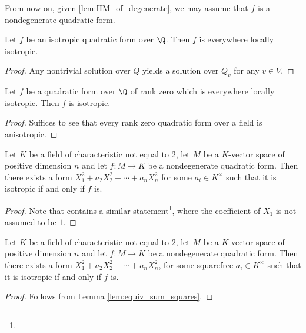 From now on, given \ref{lem:HM_of_degenerate}, we may assume that $f$ is a nondegenerate quadratic form.

\begin{lemma}\label{lem:ev_loc_isotr_of_isotr}
\leanok
Let $f$ be an isotropic quadratic form over $\Q$. Then $f$ is everywhere locally isotropic.
\end{lemma}
\begin{proof}
\leanok
Any nontrivial solution over $Q$ yields a solution over $Q_v$ for any $v \in V$.
\end{proof}

\begin{lemma}\label{lem:isotr_of_rk_zero}
	\leanok
	Let $f$ be a quadratic form over $\Q$ of rank zero which is everywhere locally isotropic. Then $f$ is isotropic.
\end{lemma}
\begin{proof}
\leanok
Suffices to see that every rank zero quadratic form over a field is anisotropic.
\end{proof}

\begin{lemma}\label{lem:equiv_sum_squares}
\leanok
Let $K$ be a field of characteristic not equal to $2$, let $M$ be a $K$-vector space of positive dimension $n$ and let $f : M \to K$ be a
nondegenerate quadratic form. Then there exists a form $X_1^2 +  a_2X_2^2 + \cdots + a_nX_n^2$ for some $a_i \in K^\times$ such that it is isotropic if and only if $f$ is.
\end{lemma}
\begin{proof}
\leanok
Note that \mathlib contains a similar statement\footnote{}, where the coefficient of $X_1$ is not assumed to be $1$.
\end{proof}

\begin{lemma}\label{lem:equiv_sum_squares_sqfree}
	\leanok
	Let $K$ be a field of characteristic not equal to $2$, let $M$ be a $K$-vector space of positive dimension $n$ and let $f : M \to K$ be a
	nondegenerate quadratic form. Then there exists a form $X_1^2 +  a_2X_2^2 + \cdots + a_nX_n^2$, for some squarefree $a_i \in K^\times$ such that it is isotropic if and only if $f$ is.
\end{lemma}
\begin{proof}
\leanok
Follows from Lemma \ref{lem:equiv_sum_squares}.
\end{proof}

